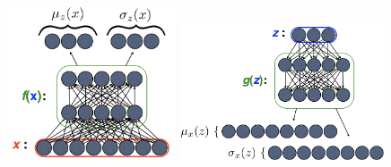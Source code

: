 \documentclass[11pt,mathserif]{beamer}
\begin{document}
{{\begin{figure}
\centering
\includegraphics[width=5cm]{VAE-inferenceModelGaussian.png}
\includegraphics[width=6cm]{VAE-generativeModelGaussian.png}
\end{figure}
}

}
\end{document}
